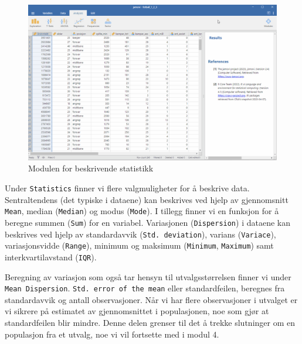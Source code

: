 \documentclass[
  letterpaper,
  DIV=11,
  numbers=noendperiod,
  oneside]{scrreprt}
\begin{document}
\begin{figure}

{\centering \includegraphics{img/01-jamovi/descriptives.gif}

}

\caption{\label{fig-deskriptiv}Modulen for beskrivende statistikk}

\end{figure}

Under \texttt{Statistics} finner vi flere valgmuligheter for å beskrive
data. Sentraltendens (det typiske i dataene) kan beskrives ved hjelp av
gjennomsnitt \texttt{Mean}, median (\texttt{Median}) og modus
(\texttt{Mode}). I tillegg finner vi en funksjon for å beregne summen
(\texttt{Sum}) for en variabel. Variasjonen (\texttt{Dispersion}) i
dataene kan beskrives ved hjelp av standardavvik
(\texttt{Std.\ deviation}), varians (\texttt{Variace}), variasjonsvidde
(\texttt{Range}), minimum og maksimum (\texttt{Minimum},
\texttt{Maximum}) samt interkvartilavstand (\texttt{IQR}).

Beregning av variasjon som også tar hensyn til utvalgsstørrelsen finner
vi under \texttt{Mean\ Dispersion}. \texttt{Std.\ error\ of\ the\ mean}
eller standardfeilen, beregnes fra standardavvik og antall
observasjoner. Når vi har flere observasjoner i utvalget er vi sikrere
på estimatet av gjennomsnittet i populasjonen, noe som gjør at
standardfeilen blir mindre. Denne delen grenser til det å trekke
slutninger om en populasjon fra et utvalg, noe vi vil fortsette med i
modul 4.
\end{document}
